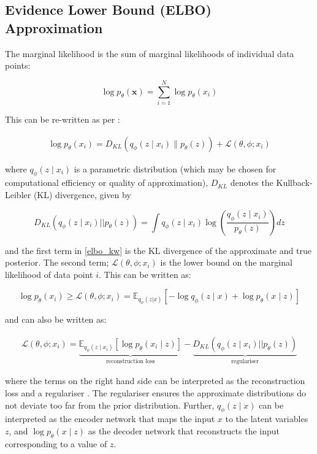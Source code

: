 \documentclass{mldsmsc}
\begin{document}
\subsection{Evidence Lower Bound (ELBO) Approximation}

The marginal likelihood is the sum of marginal likelihoods of individual data points: 

$$
\log p_\theta(\mathbf{x}) = \sum_{i=1}^N \log p_\theta(x_i)
$$

This can be re-written as per \cite{kingma2013auto}:

\begin{align}
	\log p_\theta(x_i) = D_{KL}\left( q_\phi(z \mid x_i) \| p_\theta(z) \right) + \mathcal{L}(\theta, \phi; x_i)\label{elbo_kw} 
\end{align}

where $q_\phi({z} \mid {x_i})$ is a parametric distribution (which may be chosen for computational efficiency or quality of approximation), $D_{KL}$ denotes the Kullback-Leibler (KL) divergence, given by

$$
D_{KL}\left( q_\phi({z}\mid{x_i}) || p_\theta({z}) \right) = \int q_\phi({z}\mid{x_i})\log\left(\frac{q_\phi({z}\mid{x_i})}{p_\theta({z})}\right)d{z}
$$

and the first term in \ref{elbo_kw} is the KL divergence of the approximate and true posterior. The second term; $\mathcal{L}(\theta, \phi; x_i)$ is the lower bound on the marginal likelihood of data point $i$. This can be written as: 

$$
	\log p_\theta(x_i) \ge \mathcal{L}(\theta, \phi; x_i) = \mathbb{E}_{q_\phi(z|x)} \left[ -\log q_\phi(z \mid x) + \log p_\theta(x \mid z)\right] 
$$


and can also be written as:

\begin{align}
\mathcal{L}(\theta, \phi; {x_i}) = \underbrace{\mathbb{E}_{q_\phi({z}\mid{x_i})} \left[ \log p_\theta({x_i}\mid{z})\right]}_{\text{reconstruction loss}} - \underbrace{D_{KL}\left( q_\phi({z}\mid{x_i}) || p_\theta({z}) \right)}_{\text{regulariser}} \label{loss_fn} 
\end{align}

where the terms on the right hand side can be interpreted as the reconstruction loss and a regulariser \citep{webster2023dl} . The regulariser ensures the approximate distributions do not deviate too far from the prior distribution. Further, $q_\phi({z}\mid{x})$ can be interpreted as the encoder network that maps the input $x$ to the latent variables $z$, and $\log p_\theta({x}\mid{z})$ as the decoder network that reconstructs the input corresponding to a value of $z$.
\end{document}
